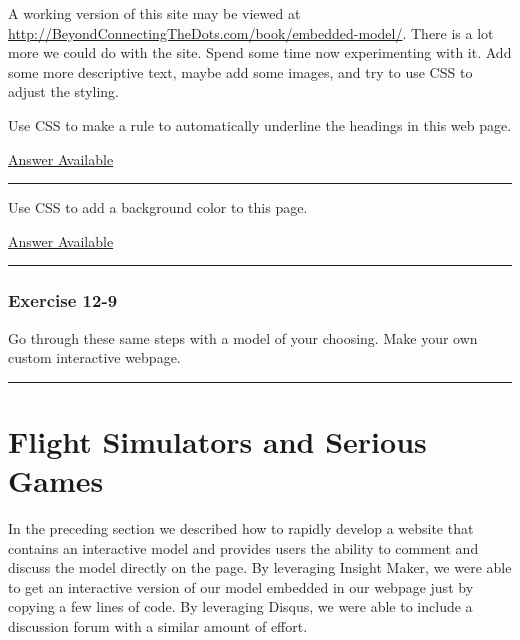 \documentclass[]{memoir}
\begin{document}
A working version of this site may be viewed at
\url{http://BeyondConnectingTheDots.com/book/embedded-model/}. There is
a lot more we could do with the site. Spend some time now experimenting
with it. Add some more descriptive text, maybe add some images, and try
to use CSS to adjust the styling.


Use CSS to make a rule to automatically underline the headings in this
web page.

\hyperref[Ans-12-7]{Answer Available}

\begin{center}\rule{3in}{0.4pt}\end{center}


Use CSS to add a background color to this page.

\hyperref[Ans-12-8]{Answer Available}

\begin{center}\rule{3in}{0.4pt}\end{center}

\subsubsection{Exercise 12-9}

Go through these same steps with a model of your choosing. Make your own
custom interactive webpage.

\begin{center}\rule{3in}{0.4pt}\end{center}

\section{Flight Simulators and Serious Games}

In the preceding section we described how to rapidly develop a website
that contains an interactive model and provides users the ability to
comment and discuss the model directly on the page. By leveraging
Insight Maker, we were able to get an interactive version of our model
embedded in our webpage just by copying a few lines of code. By
leveraging Disqus, we were able to include a discussion forum with a
similar amount of effort.
\end{document}
